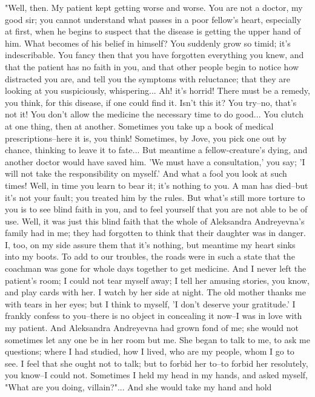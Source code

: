 "Well, then. My patient kept getting worse and worse. You are not a
doctor, my good sir; you cannot understand what passes in a poor
fellow's heart, especially at first, when he begins to suspect that
the disease is getting the upper hand of him. What becomes of his
belief in himself? You suddenly grow so timid; it's indescribable. You
fancy then that you have forgotten everything you knew, and that the
patient has no faith in you, and that other people begin to notice how
distracted you are, and tell you the symptoms with reluctance; that
they are looking at you suspiciously, whispering... Ah! it's horrid!
There must be a remedy, you think, for this disease, if one could find
it. Isn't this it? You try--no, that's not it! You don't allow the
medicine the necessary time to do good... You clutch at one thing,
then at another. Sometimes you take up a book of medical
prescriptions--here it is, you think! Sometimes, by Jove, you pick one
out by chance, thinking to leave it to fate... But meantime a
fellow-creature's dying, and another doctor would have saved him. 'We
must have a consultation,' you say; 'I will not take the
responsibility on myself.' And what a fool you look at such times!
Well, in time you learn to bear it; it's nothing to you. A man has
died--but it's not your fault; you treated him by the rules. But
what's still more torture to you is to see blind faith in you, and to
feel yourself that you are not able to be of use. Well, it was just
this blind faith that the whole of Aleksandra Andreyevna's family had
in me; they had forgotten to think that their daughter was in danger.
I, too, on my side assure them that it's nothing, but meantime my
heart sinks into my boots. To add to our troubles, the roads were in
such a state that the coachman was gone for whole days together to get
medicine. And I never left the patient's room; I could not tear myself
away; I tell her amusing stories, you know, and play cards with her. I
watch by her side at night. The old mother thanks me with tears in her
eyes; but I think to myself, 'I don't deserve your gratitude.' I
frankly confess to you--there is no object in concealing it now--I was
in love with my patient. And Aleksandra Andreyevna had grown fond of
me; she would not sometimes let any one be in her room but me. She
began to talk to me, to ask me questions; where I had studied, how I
lived, who are my people, whom I go to see. I feel that she ought not
to talk; but to forbid her to--to forbid her resolutely, you know--I
could not. Sometimes I held my head in my hands, and asked myself,
"What are you doing, villain?"... And she would take my hand and hold
